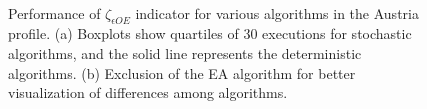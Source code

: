 			\begin{figure}
				\centering
				 \\
				\caption[Performance of $\zeta_{\epsilon OE}$ indicator for various algorithms in the Austria profile.]{Performance of $\zeta_{\epsilon OE}$ indicator for various algorithms in the Austria profile. (a) Boxplots show quartiles of 30 executions for stochastic algorithms, and the solid line represents the deterministic algorithms. (b) Exclusion of the EA algorithm for better visualization of differences among algorithms.}
				\label{fig:results:casestudy:austria:boxplot:zeta_eoe}
			\end{figure}
		
